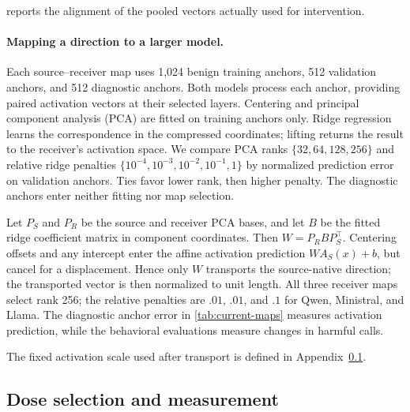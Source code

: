 



 reports the alignment of the pooled vectors
actually used for intervention.

\paragraph{Mapping a direction to a larger model.}
Each source--receiver map uses 1,024 benign training anchors, 512 validation anchors, and 512 diagnostic anchors. Both models process each anchor, providing paired activation vectors at their selected layers. Centering and principal component analysis (PCA) are fitted on training anchors only. Ridge regression learns the correspondence in the compressed
coordinates; lifting returns the result to the receiver's activation space. We compare PCA ranks $\{32,64,128,256\}$ and relative ridge penalties $\{10^{-4},10^{-3},10^{-2},10^{-1},1\}$ by normalized prediction error on validation anchors. Ties favor lower rank, then higher penalty. The diagnostic anchors enter neither fitting nor map selection.

Let $P_S$ and $P_R$ be the source and receiver PCA bases, and let $B$
be the fitted ridge coefficient matrix in component coordinates. Then
$W=P_R B P_S^\top$. Centering offsets and any intercept enter the affine
activation prediction $WA_S(x)+b$, but cancel for a displacement. Hence
only $W$ transports the source-native direction; the transported vector is then normalized to unit length. All three receiver maps select rank 256; the relative
penalties are $.01$, $.01$, and $.1$ for Qwen, Ministral, and Llama. The diagnostic anchor error in \cref{tab:current-maps} measures activation prediction, while the behavioral evaluations measure changes in harmful calls.

The fixed activation scale used after transport is defined in Appendix~\ref{app:dose-details}.

\subsection{Dose selection and measurement}
\label{app:dose-details}

